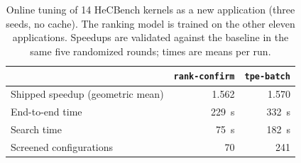 \documentclass[10pt]{article}
\newcommand{\code}[1]{\texttt{#1}}
\begin{document}
\begin{table}[t]
\centering
\caption{Online tuning of 14 HeCBench kernels as a new application (three seeds,
no cache). The ranking model is trained on the other eleven applications.
Speedups are validated against the baseline in the same five randomized
rounds; times are means per run.}
\label{tab:heconline}
\small
\begin{tabular}{lrr}
\toprule
& \code{rank-confirm} & \code{tpe-batch} \\
\midrule
Shipped speedup (geometric mean) & 1.562 & 1.570 \\
End-to-end time & 229~s & 332~s \\
Search time & 75~s & 182~s \\
Screened configurations & 70 & 241 \\
\bottomrule
\end{tabular}
\end{table}
\end{document}
